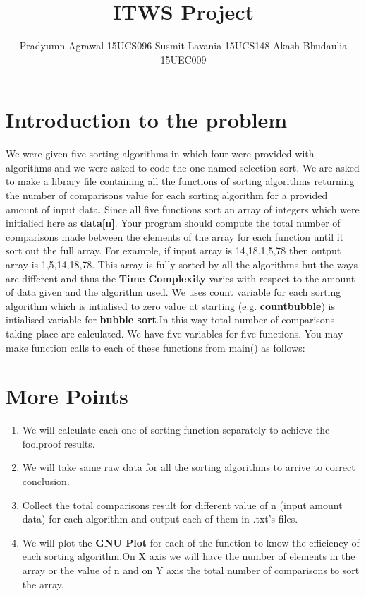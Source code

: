 \documentclass{IEEEtran}
\begin{document}
\title{ITWS Project}

\author{Pradyumn Agrawal 15UCS096 Susmit Lavania 15UCS148 Akash Bhudaulia 15UEC009}
\maketitle


\section{Introduction to the problem}
We were given five sorting algorithms in which four were provided with algorithms and we were asked to code the one named selection sort. We are asked to make a library file containing all the functions of sorting algorithms returning the number of comparisons value for each sorting algorithm for a provided amount of input data. Since all five functions sort an array of integers which were initialied here as \textbf{data[n]}. Your program should compute the total number of comparisons made between the elements of the array for each function until it sort out the full array. For example, if input array is {14,18,1,5,78} then output array is {1,5,14,18,78}. This array is fully sorted by all the algorithms but the ways are different and thus the \textbf{Time Complexity} varies with respect to the amount of data given and the algorithm used. We uses count variable for each sorting algorithm which is intialised to zero value at starting (e.g. \textbf{countbubble}) is intialised variable for \textbf{bubble sort}.In this way total number of comparisons taking place are calculated. We have five variables for five functions. You may make function calls to each of these functions from main() as follows:
\section{More Points}
\begin{enumerate}
\item We will calculate each one of sorting function separately to achieve the foolproof results.
\item We will take same raw data for all the sorting algorithms to arrive to correct conclusion.
\item Collect the total comparisons result for different value of n (input amount data) for each algorithm and output each of them in .txt's files.
\item We will plot the \textbf{GNU Plot} for each of the function to know the efficiency of each sorting algorithm.On X axis we will have the number of elements in the array or the value of n and on Y axis the total number of comparisons to sort the array.
\end{enumerate}
\end{document}
